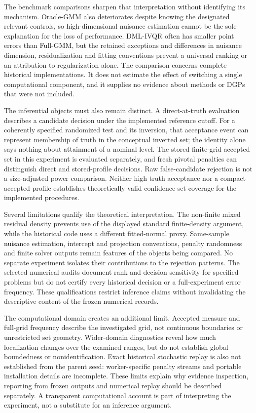 The benchmark comparisons sharpen that interpretation without identifying its mechanism. Oracle-GMM also deteriorates despite knowing the designated relevant controls, so high-dimensional nuisance estimation cannot be the sole explanation for the loss of performance. DML-IVQR often has smaller point errors than Full-GMM, but the retained exceptions and differences in nuisance dimension, residualization and fitting conventions prevent a universal ranking or an attribution to regularization alone. The comparison concerns complete historical implementations. It does not estimate the effect of switching a single computational component, and it supplies no evidence about methods or DGPs that were not included.

The inferential objects must also remain distinct. A direct-at-truth evaluation describes a candidate decision under the implemented reference cutoff. For a coherently specified randomized test and its inversion, that acceptance event can represent membership of truth in the conceptual inverted set; the identity alone says nothing about attainment of a nominal level. The stored finite-grid accepted set in this experiment is evaluated separately, and fresh pivotal penalties can distinguish direct and stored-profile decisions. Raw false-candidate rejection is not a size-adjusted power comparison. Neither high truth acceptance nor a compact accepted profile establishes theoretically valid confidence-set coverage for the implemented procedures.

Several limitations qualify the theoretical interpretation. The non-finite mixed residual density prevents use of the displayed standard finite-density argument, while the historical code uses a different fitted-normal proxy. Same-sample nuisance estimation, intercept and projection conventions, penalty randomness and finite solver outputs remain features of the objects being compared. No separate experiment isolates their contributions to the rejection patterns. The selected numerical audits document rank and decision sensitivity for specified problems but do not certify every historical decision or a full-experiment error frequency. These qualifications restrict inference claims without invalidating the descriptive content of the frozen numerical records.

The computational domain creates an additional limit. Accepted measure and full-grid frequency describe the investigated grid, not continuous boundaries or unrestricted set geometry. Wider-domain diagnostics reveal how much localization changes over the examined ranges, but do not establish global boundedness or nonidentification. Exact historical stochastic replay is also not established from the parent seed: worker-specific penalty streams and portable installation details are incomplete. These limits explain why evidence inspection, reporting from frozen outputs and numerical replay should be described separately. A transparent computational account is part of interpreting the experiment, not a substitute for an inference argument.

